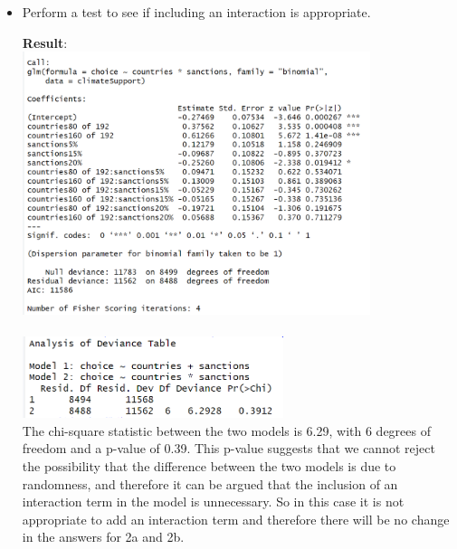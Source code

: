 \documentclass[12pt,letterpaper]{article}
\begin{document}
\begin{enumerate}
\begin{enumerate}
		\begin{itemize}
			\item Perform a test to see if including an interaction is appropriate.
			 
			\textbf{Result}:\\
			\includegraphics[width=0.8\textwidth]{Q2c1.png}\\
			\\
			\includegraphics[width=0.6\textwidth]{Q2c2.png}\\
			The chi-square statistic between the two models is 6.29, with 6 degrees of freedom and a p-value of 0.39. This p-value suggests that we cannot reject the possibility that the difference between the two models is due to randomness, and therefore it can be argued that the inclusion of an interaction term in the model is unnecessary. So in this case it is not appropriate to add an interaction term and therefore there will be no change in the answers for 2a and 2b.\\
		\end{itemize}
	\end{enumerate}
	\end{enumerate}
\end{document}

